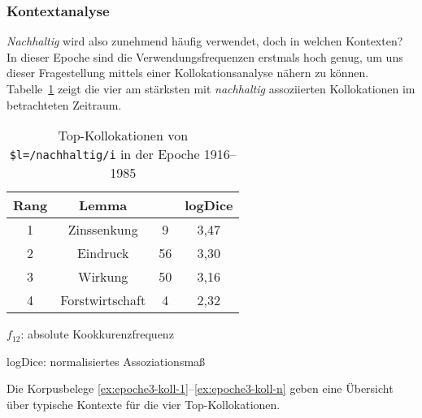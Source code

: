 \documentclass[
    german,
    a4paper,%
    12pt,%
    oneside,%
    toc=bibliography,
    final,
]{scrartcl}
\begin{document}
\subsubsection{Kontextanalyse}

\textit{Nachhaltig} wird also zunehmend häufig verwendet, doch in welchen Kontexten? In dieser Epoche sind die Verwendungsfrequenzen erstmals hoch genug, um uns dieser Fragestellung mittels einer Kollokationsanalyse nähern zu können. Tabelle~\ref{tab:kollokationen-epoche3} zeigt die vier am stärksten mit \textit{nachhaltig} assoziierten Kollokationen im betrachteten Zeitraum.

\begin{table}[h!]
	\centering
	\renewcommand{\arraystretch}{1.5}
	
	\caption{Top-Kollokationen von \lstinline|$l=/nachhaltig/i| in der Epoche 1916–1985\protect\footnotemark}
	\label{tab:kollokationen-epoche3}
	
	\begin{threeparttable}
	
	\begin{tabular}{cccc}
	\textbf{Rang} & \textbf{Lemma} & \boldmath{$f_{12}$} & \textbf{logDice} \\ \hline
	1 & Zinssenkung & 9 & 3,47 \\ \hline
	2 & Eindruck & 56 & 3,30 \\ \hline
	3 & Wirkung & 50 & 3,16 \\ \hline
	4 & Forstwirtschaft & 4 & 2,32 \\ \hline
	\end{tabular} 
	
	\begin{tablenotes}
	\footnotesize
	\setlength{\itemindent}{-1.2em}
	\item $f_{12}$: absolute Kookkurenzfrequenz
	\item logDice: normalisiertes Assoziationsmaß
	\end{tablenotes}
	
	\end{threeparttable}
\end{table}


Die Korpusbelege \ref{ex:epoche3-koll-1}–\ref{ex:epoche3-koll-n} geben eine Übersicht über typische Kontexte für die vier Top-Kollokationen.
\end{document}
